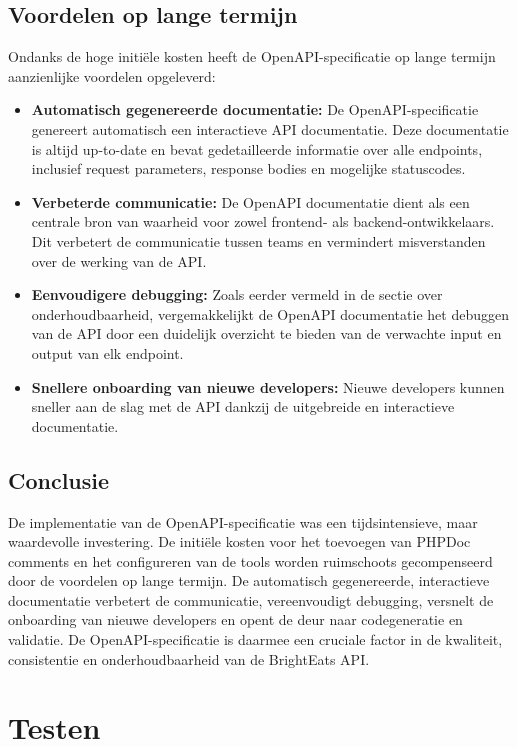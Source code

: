 \subsection{Voordelen op lange termijn}

Ondanks de hoge initiële kosten heeft de OpenAPI-specificatie op lange termijn aanzienlijke voordelen opgeleverd:

\begin{itemize}
  \item \textbf{Automatisch gegenereerde documentatie:} De OpenAPI-specificatie genereert automatisch een interactieve API documentatie. Deze documentatie is altijd up-to-date en bevat gedetailleerde informatie over alle endpoints, inclusief request parameters, response bodies en mogelijke statuscodes.
  \item \textbf{Verbeterde communicatie:} De OpenAPI documentatie dient als een centrale bron van waarheid voor zowel frontend- als backend-ontwikkelaars. Dit verbetert de communicatie tussen teams en vermindert misverstanden over de werking van de API.
  \item \textbf{Eenvoudigere debugging:} Zoals eerder vermeld in de sectie over onderhoudbaarheid, vergemakkelijkt de OpenAPI documentatie het debuggen van de API door een duidelijk overzicht te bieden van de verwachte input en output van elk endpoint.
  \item \textbf{Snellere onboarding van nieuwe developers:} Nieuwe developers kunnen sneller aan de slag met de API dankzij de uitgebreide en interactieve documentatie.
\end{itemize}

\subsection{Conclusie}

De implementatie van de OpenAPI-specificatie was een tijdsintensieve, maar waardevolle investering. De initiële kosten voor het toevoegen van PHPDoc comments en het configureren van de tools worden ruimschoots gecompenseerd door de voordelen op lange termijn. De automatisch gegenereerde, interactieve documentatie verbetert de communicatie, vereenvoudigt debugging, versnelt de onboarding van nieuwe developers en opent de deur naar codegeneratie en validatie. De OpenAPI-specificatie is daarmee een cruciale factor in de kwaliteit, consistentie en onderhoudbaarheid van de BrightEats API.

\section{Testen}

